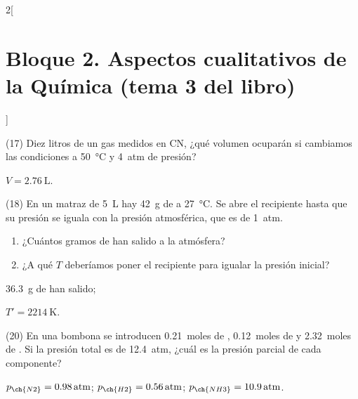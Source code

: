\documentclass[10pt]{article}
\begin{document}
\begin{multicols}{2}[
    \section{Bloque 2. Aspectos cualitativos de la Química (tema 3 del libro)}
  ]
\begin{exercise}[
    tags    = {},
    topics  = {química,química básica},
    source  = {FQ 1B MGH 2016, p84, e17},
  ]
  (17) Diez litros de un gas medidos en CN, ¿qué volumen ocuparán
  si cambiamos las condiciones a \SI{50}{\celsius} y \SI{4}{atm} de presión?
\end{exercise}

\begin{solution}
  \( V = \SI{2.76}{\liter}\).
\end{solution}




\begin{exercise}[
    tags    = {},
    topics  = {química,química básica},
    source  = {FQ 1B MGH 2016, p84, e18},
  ]
  (18) En un matraz de \SI{5}{\liter} hay \SI{42}{\gram} de  a \SI{27}{\celsius}. Se abre el recipiente hasta que su presión se iguala con la presión atmosférica, que es de \SI{1}{atm}.
  \begin{enumerate}
    \item ¿Cuántos gramos de  han salido a la atmósfera?
    \item ¿A qué \( T \) deberíamos poner el recipiente para igualar la presión inicial?
  \end{enumerate}
\end{exercise}

\begin{solution}
  \begin{enumerate*}
    \item \SI{36.3}{\gram} de  han salido;
    \item \( T' = \SI{2214}{\kelvin} \).
  \end{enumerate*}
\end{solution}




\begin{exercise}[
    tags    = {},
    topics  = {química,química básica},
    source  = {FQ 1B MGH 2016, p84, e20},
  ]
  (20) En una bombona se introducen \SI{0.21}{moles} de , \SI{0.12}{moles}
  de  y \SI{2.32}{moles} de . Si la presión total es de \SI{12.4}{atm}, ¿cuál es la presión parcial de cada componente?
\end{exercise}

\begin{solution}
  \( p_{\ch{N2}} = \SI{0.98}{atm} \); \( p_{\ch{H2}} = \SI{0.56}{atm} \); \( p_{\ch{NH3}} = \SI{10.9}{atm} \).
\end{solution}





\end{multicols}
\end{document}
